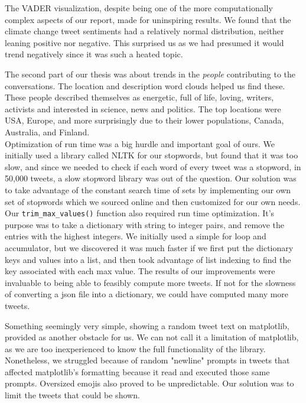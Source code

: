 \documentclass[fontsize=11pt]{article}
\begin{document}
The VADER visualization, despite being one of the more computationally complex aspects of our report, made for uninspiring results. We found that the climate change tweet sentiments had a relatively normal distribution, neither leaning positive nor negative. This surprised us as we had presumed it would trend negatively since it was such a heated topic.

The second part of our thesis was about trends in the \textit{people} contributing to the conversations. The location and description word clouds helped us find these. These people described themselves as energetic, full of life, loving, writers, activists and interested in science, news and politics. The top locations were USA, Europe, and more surprisingly due to their lower populations, Canada, Australia, and Finland. \\

Optimization of run time was a big hurdle and important goal of ours. We initially used a library called NLTK for our stopwords, but found that it was too slow, and since we needed to check if each word of every tweet was a stopword, in 50,000 tweets, a slow stopword library was out of the question. Our solution was to take advantage of the constant search time of sets by implementing our own set of stopwords which we sourced online and then customized for our own needs. Our \texttt{trim\_max\_values()} function also required run time optimization. It's purpose was to take a dictionary with string to integer pairs, and remove the entries with the highest integers. We initially used a simple for loop and accumulator, but we discovered it was much faster if we first put the dictionary keys and values into a list, and then took advantage of list indexing to find the key associated with each max value. The results of our improvements were invaluable to being able to feasibly compute more tweets. If not for the slowness of converting a json file into a dictionary, we could have computed many more tweets.

Something seemingly very simple, showing a random tweet text on matplotlib, provided as another obstacle for us. We can not call it a limitation of matplotlib, as we are too inexperienced to know the full functionality of the library. Nonetheless, we struggled because of random "newline" prompts in tweets that affected matplotlib's formatting because it read and executed those same prompts. Oversized emojis also proved to be unpredictable. Our solution was to limit the tweets that could be shown. 
\end{document}
